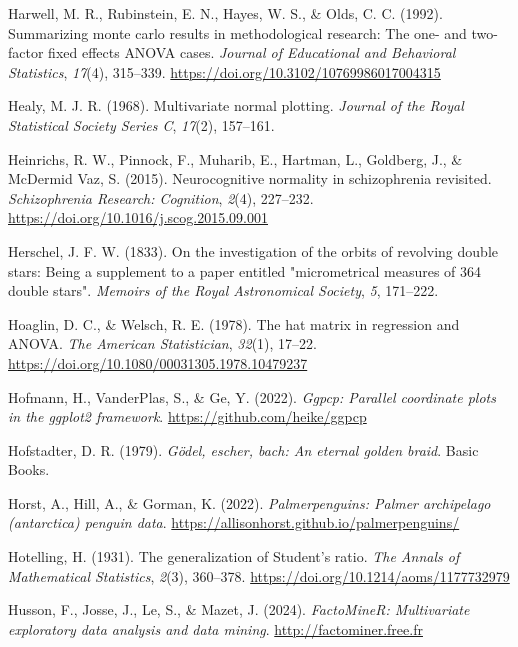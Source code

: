 \documentclass[
  letterpaper,
  10pt,
  krantz2]{krantz}
\newlength{\cslhangindent}
\newenvironment{CSLReferences}[2] %
 {\begin{list}{}{%
  \setlength{\itemindent}{0pt}
  \setlength{\leftmargin}{0pt}
  \setlength{\parsep}{0pt}
  \ifodd #1
   \setlength{\leftmargin}{\cslhangindent}
   \setlength{\itemindent}{-1\cslhangindent}
  \fi
  \setlength{\itemsep}{#2\baselineskip}}}
 {\end{list}}
\begin{document}
\begin{CSLReferences}{1}{0}
Harwell, M. R., Rubinstein, E. N., Hayes, W. S., \& Olds, C. C. (1992).
Summarizing monte carlo results in methodological research: The one- and
two-factor fixed effects {ANOVA} cases. \emph{Journal of Educational and
Behavioral Statistics}, \emph{17}(4), 315--339.
\url{https://doi.org/10.3102/10769986017004315}

Healy, M. J. R. (1968). Multivariate normal plotting. \emph{Journal of
the Royal Statistical Society Series C}, \emph{17}(2), 157--161.

Heinrichs, R. W., Pinnock, F., Muharib, E., Hartman, L., Goldberg, J.,
\& McDermid Vaz, S. (2015). Neurocognitive normality in schizophrenia
revisited. \emph{Schizophrenia Research: Cognition}, \emph{2}(4),
227--232. \url{https://doi.org/10.1016/j.scog.2015.09.001}

Herschel, J. F. W. (1833). On the investigation of the orbits of
revolving double stars: Being a supplement to a paper entitled
"micrometrical measures of 364 double stars". \emph{Memoirs of the Royal
Astronomical Society}, \emph{5}, 171--222.

Hoaglin, D. C., \& Welsch, R. E. (1978). The hat matrix in regression
and {ANOVA}. \emph{The American Statistician}, \emph{32}(1), 17--22.
\url{https://doi.org/10.1080/00031305.1978.10479237}

Hofmann, H., VanderPlas, S., \& Ge, Y. (2022). \emph{Ggpcp: Parallel
coordinate plots in the ggplot2 framework}.
\url{https://github.com/heike/ggpcp}

Hofstadter, D. R. (1979). \emph{Gödel, escher, bach: An eternal golden
braid}. Basic Books.

Horst, A., Hill, A., \& Gorman, K. (2022). \emph{Palmerpenguins: Palmer
archipelago (antarctica) penguin data}.
\url{https://allisonhorst.github.io/palmerpenguins/}

Hotelling, H. (1931). The generalization of {Student's} ratio. \emph{The
Annals of Mathematical Statistics}, \emph{2}(3), 360--378.
\url{https://doi.org/10.1214/aoms/1177732979}

Husson, F., Josse, J., Le, S., \& Mazet, J. (2024). \emph{FactoMineR:
Multivariate exploratory data analysis and data mining}.
\url{http://factominer.free.fr}


\end{CSLReferences}
\end{document}
